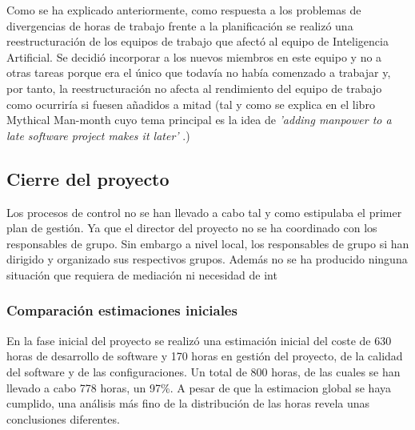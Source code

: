 Como se ha explicado anteriormente, como respuesta a los problemas de divergencias de horas de trabajo frente a la planificación se realizó una reestructuración de los equipos de trabajo que afectó al equipo de Inteligencia Artificial. Se decidió incorporar a los nuevos miembros en este equipo y no a otras tareas porque era el único que todavía no había comenzado a trabajar y, por tanto, la reestructuración no afecta al rendimiento del equipo de trabajo como ocurriría si fuesen añadidos a mitad (tal y como se explica en el libro Mythical Man-month cuyo tema principal es la idea de \textit{'adding manpower to a late software project makes it later'} \cite{libroMMM}.)


\subsection{Cierre del proyecto}
\label{Cierre del proyecto}
Los procesos de control no se han llevado a cabo tal y como estipulaba el primer plan de gestión. Ya que el director del proyecto no se ha coordinado con los responsables de grupo. Sin embargo a nivel local, los responsables de grupo si han dirigido y organizado sus respectivos grupos. Además no se ha producido ninguna situación que requiera de mediación ni necesidad de int
\subsubsection{Comparación estimaciones iniciales}
En la fase inicial del proyecto se realizó una estimación inicial del coste de 630 horas de desarrollo de software y 170 horas en gestión del proyecto, de la calidad del software y de las configuraciones. Un total de 800 horas, de las cuales se han llevado a cabo 778 horas, un 97\%. A pesar de que la estimacion global se haya cumplido, una análisis más fino de la distribución de las horas revela unas conclusiones diferentes.

